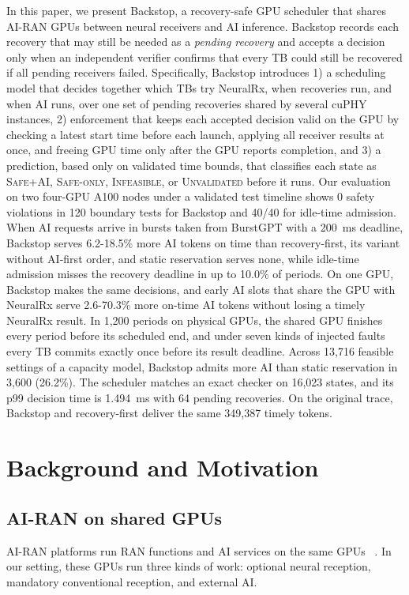 \documentclass[acmsmall,screen,review,anonymous]{acmart}
\newcommand{\sys}{Backstop\xspace}
\newcommand{\QSU}{\textsc{Safe+AI}\xspace}
\newcommand{\QSN}{\textsc{Safe-only}\xspace}
\newcommand{\MI}{\textsc{Infeasible}\xspace}
\newcommand{\UQ}{\textsc{Unvalidated}\xspace}
\newcommand{\NRx}{NeuralRx\xspace}
\begin{document}
In this paper, we present \sys, a recovery-safe GPU scheduler that shares AI-RAN GPUs between neural
receivers and AI inference. \sys records each recovery that may still be needed as a \emph{pending
recovery} and accepts a decision only when an independent verifier confirms that every TB could still be
recovered if all pending receivers failed. Specifically, \sys introduces 1) a scheduling model that
decides together which TBs try \NRx, when recoveries run, and when AI runs, over one set of pending
recoveries shared by several cuPHY instances, 2) enforcement that keeps each accepted decision valid on
the GPU by checking a latest start time before each launch, applying all receiver results at once, and
freeing GPU time only after the GPU reports completion, and 3) a prediction, based only on validated time
bounds, that classifies each state as \QSU, \QSN, \MI, or \UQ before it runs. Our evaluation on two
four-GPU A100 nodes under a validated test timeline shows 0 safety violations in 120 boundary tests for
\sys and 40/40 for idle-time admission. When AI requests arrive in bursts taken from BurstGPT with a
200~ms deadline, \sys serves 6.2-18.5\% more AI tokens on time than recovery-first, its variant without
AI-first order, and static reservation serves none, while idle-time admission misses the recovery
deadline in up to 10.0\% of periods. On one GPU, \sys makes the same decisions, and early AI slots that
share the GPU with \NRx serve 2.6-70.3\% more on-time AI tokens without losing a timely \NRx result. In
1,200 periods on physical GPUs, the shared GPU finishes every period before its scheduled end, and under
seven kinds of injected faults every TB commits exactly once before its result deadline. Across 13,716
feasible settings of a capacity model, \sys admits more AI than static reservation in 3,600 (26.2\%).
The scheduler matches an exact checker on 16,023 states, and its p99 decision time is 1.494~ms with 64
pending recoveries. On the original trace, \sys and recovery-first deliver the same 349,387 timely
tokens.

\section{Background and Motivation}

\subsection{AI-RAN on shared GPUs}

AI-RAN platforms run RAN functions and AI services on the same GPUs
~\cite{aerial,yinyangran,cloudric,interplay,caora,haf}. In our setting, these GPUs run three kinds of
work: optional neural reception, mandatory conventional reception, and external AI.
\end{document}
